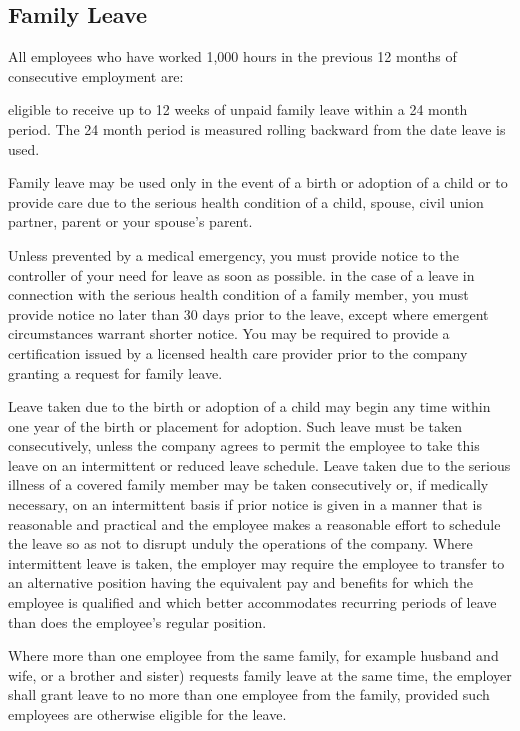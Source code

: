 \subsection{Family Leave}

All employees who have worked 1,000 hours in the previous 12 months of consecutive employment are:

eligible to receive up to 12 weeks of unpaid family leave within a 24 month period. The 24 month period is measured rolling backward from the date leave is used.

Family leave may be used only in the event of a birth or adoption of a child or to provide care due to the serious health condition of a child, spouse, civil union partner, parent or your spouse's parent.

Unless prevented by a medical emergency, you must provide notice to the controller of your need for leave as soon as possible. in the case of a leave in connection with the serious health condition of a family member, you must provide notice no later than 30 days prior to the leave, except where emergent circumstances warrant shorter notice. You may be required to provide a certification issued by a licensed health care provider prior to the company granting a request for family leave.

Leave taken due to the birth or adoption of a child may begin any time within one year of the birth or placement for adoption. Such leave must be taken consecutively, unless the company agrees to permit the employee to take this leave on an intermittent or reduced leave schedule. Leave taken due to the serious illness of a covered family member may be taken consecutively or, if medically necessary, on an intermittent basis if prior notice is given in a manner that is reasonable and practical and the employee makes a reasonable effort to schedule the leave so as not to disrupt unduly the operations of the company. Where intermittent leave is taken, the employer may require the employee to transfer to an alternative position having the equivalent pay and benefits for which the employee is qualified and which better accommodates recurring periods of leave than does the employee's regular position.

Where more than one employee from the same family, for example husband and wife, or a brother and sister) requests family leave at the same time, the employer shall grant leave to no more than one employee from the family, provided such employees are otherwise eligible for the leave.

